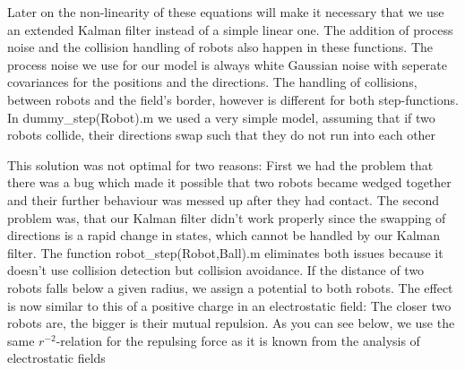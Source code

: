 
\parskip 20pt

Later on the non-linearity of these equations will make it necessary that we use an extended Kalman filter instead of a simple linear one. The addition of process noise and the collision handling of robots also happen in these functions. The process noise we use for our model is always white Gaussian noise with seperate covariances for the positions and the directions. The handling of collisions, between robots and the field's border, however is different for both step-functions. In {\selectfont dummy\_step(Robot).m} we used a very simple model, assuming that if two robots collide, their directions swap such that they do not run into each other


 
This solution was not optimal for two reasons: First we had the problem that there was a bug which made it possible that two robots became wedged together and their further behaviour was messed up after they had contact. The second problem was, that our Kalman filter didn't work properly since the swapping of directions is a rapid change in states, which cannot be handled by our Kalman filter. The function {\selectfont robot\_step(Robot,Ball).m} eliminates both issues because it doesn't use collision detection but collision avoidance. If the distance of two robots falls below a given radius, we assign a potential to both robots. The effect is now similar to this of a positive charge in an electrostatic field: The closer two robots are, the bigger is their mutual repulsion. As you can see below, we use the same \(r^{-2}\)-relation for the repulsing force as it is known from the analysis of electrostatic fields




